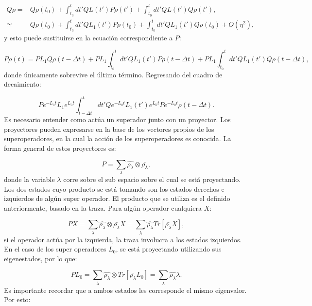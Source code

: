 \documentclass[a4paper,10pt]{report}
\begin{document}
\begin{align*}
Q\rho =& Q\rho(t_0) + \int_{t_0}^{t}dt' QL(t')P\rho(t')+\int_{t_0}^{t}dt'QL(t')Q\rho(t'),\\
\simeq & Q\rho(t_0) + \int_{t_0}^{t}dt' QL_1(t')P\rho(t_0)+\int_{t_0}^{t}dt'QL_1(t')Q\rho(t_0)+O(\eta^2),
\end{align*} y esto puede sustituirse en la ecuación correspondiente a $P$:

\begin{equation}
P\dot{\rho}(t) = PL_1Q\rho(t-\Delta t) + PL_1\int_{t_0}^{t}dt' QL_1(t')P\rho(t-\Delta t) + PL_1\int_{t_0}^{t}dt'QL_1(t')Q\rho(t-\Delta t),
\end{equation} donde únicamente sobrevive el último término. Regresando del cuadro de decaimiento:

\begin{equation}\label{ProyectionEQ}
P e^{-L_0 t}L_1e^{L_0 t}\int_{t-\Delta t}^{t}dt'Qe^{-L_0 t}L_1(t')e^{L_0 t}Pe^{-L_0 t}\rho(t-\Delta t).
\end{equation} Es necesario entender como actúa un superador junto con un proyector. Los proyectores pueden expresarse en la base de los vectores propios de los superoperadores, en la cual la acción de los superoperadores es conocida. La forma general de estos proyectores es:

\begin{equation}
P = \sum_\lambda \hat{\rho_\lambda}\otimes\bar{\rho_\lambda},
\end{equation} donde la variable $\lambda$ corre sobre el sub espacio sobre el cual se está proyectando. Los dos estados cuyo producto se está tomando son los estados derechos e izquierdos de algún super operador. El producto que se utiliza es el definido anteriormente, basado en la traza. Para algún operador cualquiera $X$:

\begin{equation}
PX=\sum_\lambda \hat{\rho_\lambda}\otimes\bar{\rho_\lambda}X = \sum_\lambda \hat{\rho_\lambda}Tr[\bar{\rho_\lambda}X],
\end{equation} si el operador actúa por la izquierda, la traza involucra a los estados izquierdos. En el caso de los super operadores $L_0$, se está proyectando utilizando sus eigenestados, por lo que:

\begin{equation}
PL_0=\sum_\lambda \hat{\rho_\lambda}\otimes Tr[\bar{\rho_\lambda}L_0] = \sum_\lambda \hat{\rho_\lambda}\lambda.
\end{equation} Es importante recordar que a ambos estados les corresponde el mismo eigenvalor. Por esto:
\end{document}
